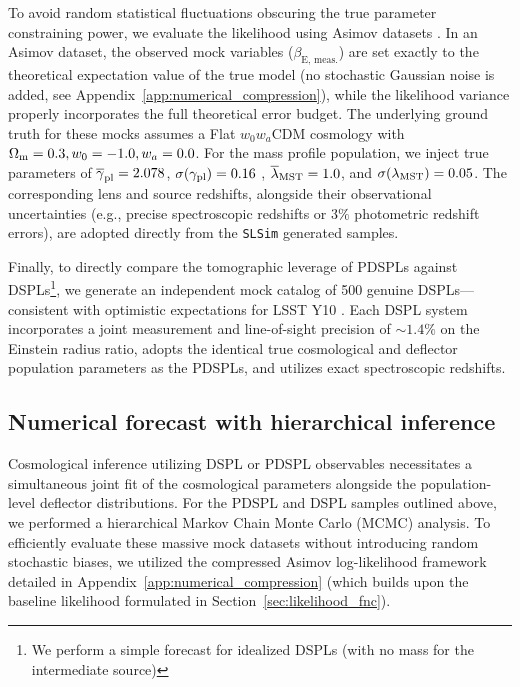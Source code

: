 \documentclass[a4paper,11pt]{article}
\begin{document}
To avoid random statistical fluctuations obscuring the true parameter constraining power, we evaluate the likelihood using Asimov datasets \citep{Cowan:2011}. In an Asimov dataset, the observed mock variables ($\beta_{\text{E, meas.}}$) are set exactly to the theoretical expectation value of the true model (no stochastic Gaussian noise is added, see Appendix~\ref{app:numerical_compression}), while the likelihood variance properly incorporates the full theoretical error budget. The underlying ground truth for these mocks assumes a Flat $w_0w_a$CDM cosmology with $\Omega_{\rm m} = 0.3, w_0 = -1.0, w_a = 0.0$. For the mass profile population, we inject true parameters of $\overline\gamma_{\rm pl} = 2.078$, $\sigma(\gamma_{\rm pl}) = 0.16$ \cite{Auger:2010}, $\overline\lambda_{\rm MST} = 1.0$, and $\sigma(\lambda_{\rm MST}) = 0.05$. The corresponding lens and source redshifts, alongside their observational uncertainties (e.g., precise spectroscopic redshifts or $3\%$ photometric redshift errors), are adopted directly from the \texttt{SLSim} generated samples.

Finally, to directly compare the tomographic leverage of PDSPLs against DSPLs\footnote{We perform a simple forecast for idealized DSPLs (with no mass for the intermediate source)}, we generate an independent mock catalog of 500 genuine DSPLs—consistent with optimistic expectations for LSST Y10 \cite{Shajib:2024}. Each DSPL system incorporates a joint measurement and line-of-sight precision of $\sim 1.4\%$ on the Einstein radius ratio, adopts the identical true cosmological and deflector population parameters as the PDSPLs, and utilizes exact spectroscopic redshifts.

\subsection{Numerical forecast with hierarchical inference}\label{sec:numerical_forecast}

Cosmological inference utilizing DSPL or PDSPL observables necessitates a simultaneous joint fit of the cosmological parameters alongside the population-level deflector distributions. For the PDSPL and DSPL samples outlined above, we performed a hierarchical Markov Chain Monte Carlo (MCMC) analysis. To efficiently evaluate these massive mock datasets without introducing random stochastic biases, we utilized the compressed Asimov log-likelihood framework detailed in Appendix~\ref{app:numerical_compression} (which builds upon the baseline likelihood formulated in Section~\ref{sec:likelihood_fnc}). 
\end{document}
